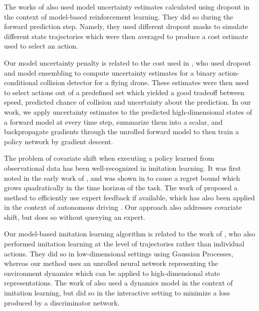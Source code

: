 \documentclass{article} %
\begin{document}
The works of \citep{DeepPilco, Chua2018} also used model uncertainty estimates calculated using dropout in the context of model-based reinforcement learning. They did so during the forward prediction step. Namely, they used different dropout masks to simulate different state trajectories which were then averaged to produce a cost estimate used to select an action.

Our model uncertainty penalty is related to the cost used in \citep{Kahn2017}, who used dropout and model ensembling to compute uncertainty estimates for a binary action-conditional collision detector for a flying drone. These estimates were then used to select actions out of a predefined set which yielded a good tradeoff between speed, predicted chance of collision and uncertainty about the prediction. In our work, we apply uncertainty estimates to the predicted high-dimensional states of a forward model at every time step, summarize them into a scalar, and backpropagate gradients through the unrolled forward model to then train a policy network by gradient descent.


The problem of covariate shift when executing a policy learned from observational data has been well-recognized in imitation learning.
It was first noted in the early work of \citep{Pomerleau91}, and was shown in \citep{Ross2010EfficientRF} to cause a regret bound which grows quadratically in the time horizon of the task.
The work of \citep{Dagger} proposed a method to efficiently use expert feedback if available, which has also been applied in the context of autonomous driving \citep{Zhang16}.
Our approach also addresses covariate shift, but does so without querying an expert.

Our model-based imitation learning algorithm is related to the work of \citep{Englert2013}, who also performed imitation learning at the level of trajectories rather than individual actions. They did so in low-dimensional settings using Gaussian Processes, whereas our method uses an unrolled neural network representing the environment dynamics which can be applied to high-dimensional state representations. The work of \citep{Baram2017EndtoEndDA} also used a dynamics model in the context of imitation learning, but did so in the interactive setting to minimize a loss produced by a discriminator network. 
\end{document}
